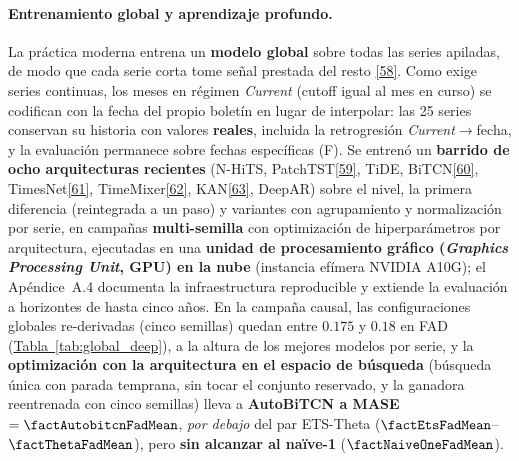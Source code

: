 \documentclass[12pt,letterpaper]{report}
\newcommand{\cita}[1]{\hyperref[bib:#1]{[#1]}}
\begin{document}
\paragraph{Entrenamiento global y aprendizaje profundo.} La práctica moderna entrena un
\textbf{modelo global} sobre todas las series apiladas, de modo que cada serie corta tome señal
prestada del resto \cita{58}. Como exige series continuas, los meses en régimen
\textit{Current} (cutoff igual al mes en curso) se codifican con la fecha del propio boletín en
lugar de interpolar: las 25 series conservan su historia con valores \textbf{reales}, incluida
la retrogresión \textit{Current}$\rightarrow$fecha, y la evaluación permanece sobre fechas
específicas (F). Se entrenó un \textbf{barrido de ocho arquitecturas recientes} (N-HiTS,
PatchTST\cita{59}, TiDE, BiTCN\cita{60}, TimesNet\cita{61}, TimeMixer\cita{62}, KAN\cita{63},
DeepAR) sobre el nivel, la primera diferencia (reintegrada a un paso) y variantes con
agrupamiento y normalización por serie, en campañas \textbf{multi-semilla} con optimización de
hiperparámetros por arquitectura, ejecutadas en una \textbf{unidad de procesamiento gráfico (\textit{Graphics Processing Unit}, GPU) en la nube} (instancia efímera
NVIDIA A10G); el Apéndice~A.4 documenta la infraestructura reproducible y extiende la
evaluación a horizontes de hasta cinco años. En la campaña causal, las configuraciones globales
re-derivadas (cinco semillas) quedan entre $0.175$ y $0.18$ en FAD
(\hyperref[tab:global_deep]{Tabla~\ref*{tab:global_deep}}), a la altura de los mejores modelos por serie, y la
\textbf{optimización con la arquitectura en el espacio de búsqueda} (búsqueda única con parada
temprana, sin tocar el conjunto reservado, y la ganadora reentrenada con cinco semillas) lleva a
\textbf{AutoBiTCN a MASE $=\factAutobitcnFadMean$}, \textit{por debajo} del par ETS-Theta
($\factEtsFadMean$--$\factThetaFadMean$), pero \textbf{sin alcanzar al naïve-1}
($\factNaiveOneFadMean$).
\end{document}
